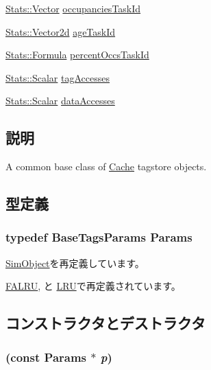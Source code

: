 \begin{DoxyCompactItemize}
\item 
\hyperlink{classStats_1_1Vector}{Stats::Vector} \hyperlink{group__CacheStatistics_ga6fa3359c33f65a569c3e2adc8d04dc26}{occupanciesTaskId}
\item 
\hyperlink{classStats_1_1Vector2d}{Stats::Vector2d} \hyperlink{group__CacheStatistics_gac02dc8ce25ce56af2d9038844ba89d99}{ageTaskId}
\item 
\hyperlink{classStats_1_1Formula}{Stats::Formula} \hyperlink{group__CacheStatistics_ga39817ed7d6dd5fa7b0a2eb2c693b223d}{percentOccsTaskId}
\item 
\hyperlink{classStats_1_1Scalar}{Stats::Scalar} \hyperlink{group__CacheStatistics_ga42eda9fe19a58cfd6ed7aaa7427664e4}{tagAccesses}
\item 
\hyperlink{classStats_1_1Scalar}{Stats::Scalar} \hyperlink{group__CacheStatistics_gad8dad26f755f9db669fc2b8dab657c0a}{dataAccesses}
\end{DoxyCompactItemize}


\subsection{説明}
A common base class of \hyperlink{classCache}{Cache} tagstore objects. 

\subsection{型定義}
\hypertarget{classBaseTags_aab33a5313a7ca07c69f8a4e6e1490375}{
\subsubsection[{Params}]{\setlength{\rightskip}{0pt plus 5cm}typedef BaseTagsParams {\bf Params}}}
\label{classBaseTags_aab33a5313a7ca07c69f8a4e6e1490375}


\hyperlink{classSimObject_a0f0761d2db586a23bb2a2880b8f387bb}{SimObject}を再定義しています。

\hyperlink{classFALRU_ac02f095611cbe1cc1b0d89ce95694168}{FALRU}, と \hyperlink{classLRU_a7817e729934956b9b3573d13924bf1eb}{LRU}で再定義されています。

\subsection{コンストラクタとデストラクタ}
\hypertarget{classBaseTags_ae200d65039ec8144c2ec926a52f4fe6f}{
\subsubsection[{BaseTags}]{ (const {\bf Params} $\ast$ {\em p})}}
\label{classBaseTags_ae200d65039ec8144c2ec926a52f4fe6f}



